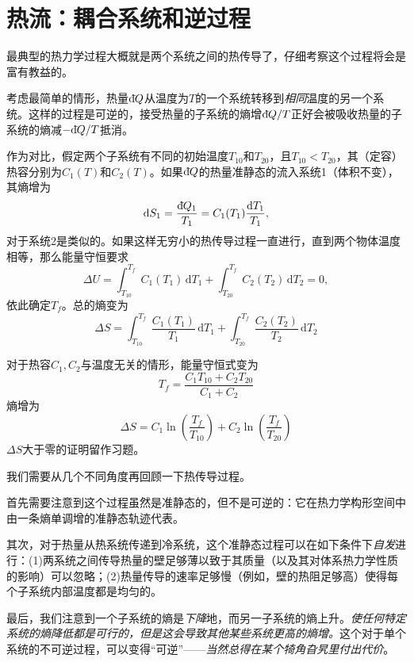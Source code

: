\section{热流：耦合系统和逆过程}
\label{sec4.4}
最典型的热力学过程大概就是两个系统之间的热传导了，仔细考察这个过程将会是富有教益的。

考虑最简单的情形，热量$\mathrm d\hspace*{-0.1em}\bar{}\hspace*{0.08em} Q$从温度为$T$的一个系统转移到{\it 相同}温度的另一个系统。这样的过程是可逆的，接受热量的子系统的熵增$\mathrm d\hspace*{-0.1em}\bar{}\hspace*{0.08em} Q/T$正好会被吸收热量的子系统的熵减$-\mathrm d\hspace*{-0.1em}\bar{}\hspace*{0.08em} Q/T$抵消。

作为对比，假定两个子系统有不同的初始温度$T_{10}$和$T_{20}$，且$T_{10}<T_{20}$，其（定容）热容分别为$C_1(T)$和$C_2(T)$。如果$\mathrm d\hspace*{-0.1em}\bar{}\hspace*{0.08em} Q$的热量准静态的流入系统1（体积不变），其熵增为
\begin{equation}
\mathrm dS_1 = \frac{\mathrm d\hspace*{-0.1em}\bar{}\hspace*{0.08em} Q_1}{T_1} = C_1(T_1)\frac{\mathrm dT_1}{T_1},
\end{equation}
对于系统2是类似的。如果这样无穷小的热传导过程一直进行，直到两个物体温度相等，那么能量守恒要求
\begin{equation}
\Delta U = \int_{T_{10}}^{T_f} C_1(T_1)\,\mathrm dT_1 + \int_{T_{20}}^{T_f}C_2(T_2)\,\mathrm dT_2 = 0,
\end{equation}
依此确定$T_f$。总的熵变为
\begin{equation}
\Delta S = \int_{T_{10}}^{T_f} \frac{C_1(T_1)}{T_1}\,\mathrm dT_1 + \int_{T_{20}}^{T_f}\frac{C_2(T_2)}{T_2}\,\mathrm dT_2
\end{equation}

对于热容$C_1,C_2$与温度无关的情形，能量守恒式变为
\begin{equation}
T_f = \frac{C_1T_{10}+C_2T_{20}}{C_1+C_2}
\end{equation}
熵增为
\begin{equation}
\Delta S = C_1\ln\left(\frac{T_f}{T_{10}}\right) + C_2\ln\left(\frac{T_f}{T_{20}}\right)
\label{equ4.5}
\end{equation}
$\Delta S$大于零的证明留作习题。

我们需要从几个不同角度再回顾一下热传导过程。

首先需要注意到这个过程虽然是准静态的，但不是可逆的：它在热力学构形空间中由一条熵单调增的准静态轨迹代表。

其次，对于热量从热系统传递到冷系统，这个准静态过程可以在如下条件下{\it 自发}进行：(1)两系统之间传导热量的壁足够薄以致于其质量（以及其对体系热力学性质的影响）可以忽略；(2)热量传导的速率足够慢（例如，壁的热阻足够高）使得每个子系统内部温度都是均匀的。

最后，我们注意到一个子系统的熵是{\it 下降}地，而另一子系统的熵上升。{\it 使任何特定系统的熵降低都是可行的，但是这会导致其他某些系统更高的熵增。}这个对于单个系统的不可逆过程，可以变得“可逆”——{\it 当然总得在某个犄角旮旯里付出代价}。

